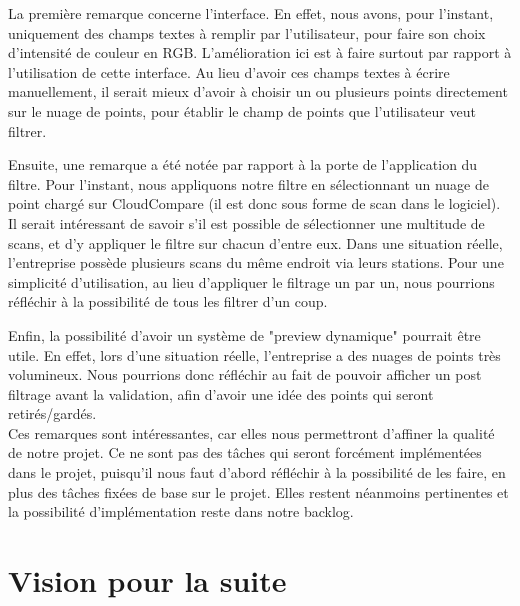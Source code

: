 \documentclass[12pt,titlepage,french]{article}
\begin{document}
La première remarque concerne l'interface. En effet, nous avons, pour l'instant, uniquement des champs textes à remplir par l'utilisateur, pour faire son choix d'intensité de couleur en RGB. L'amélioration ici est à faire surtout par rapport à l'utilisation de cette interface. Au lieu d'avoir ces champs textes à écrire manuellement, il serait mieux d'avoir à choisir un ou plusieurs points directement sur le nuage de points, pour établir le champ de points que l'utilisateur veut filtrer.

Ensuite, une remarque a été notée par rapport à la porte de l'application du filtre. Pour l'instant, nous appliquons notre filtre en sélectionnant un nuage de point chargé sur CloudCompare (il est donc sous forme de scan dans le logiciel). Il serait intéressant de savoir s'il est possible de sélectionner une multitude de scans, et d'y appliquer le filtre sur chacun d'entre eux. Dans une situation réelle, l'entreprise possède plusieurs scans du même endroit via leurs stations. Pour une simplicité d'utilisation, au lieu d'appliquer le filtrage un par un, nous pourrions réfléchir à la possibilité de tous les filtrer d'un coup.

Enfin, la possibilité d'avoir un système de "preview dynamique" pourrait être utile. En effet, lors d'une situation réelle, l'entreprise a des nuages de points très volumineux. Nous pourrions donc réfléchir au fait de pouvoir afficher un post filtrage avant la validation, afin d'avoir une idée des points qui seront retirés/gardés.\\

Ces remarques sont intéressantes, car elles nous permettront d'affiner la qualité de notre projet. Ce ne sont pas des tâches qui seront forcément implémentées dans le projet, puisqu'il nous faut d'abord réfléchir à la possibilité de les faire, en plus des tâches fixées de base sur le projet. Elles restent néanmoins pertinentes et la possibilité d'implémentation reste dans notre backlog.

\section{Vision pour la suite}

\end{document}
